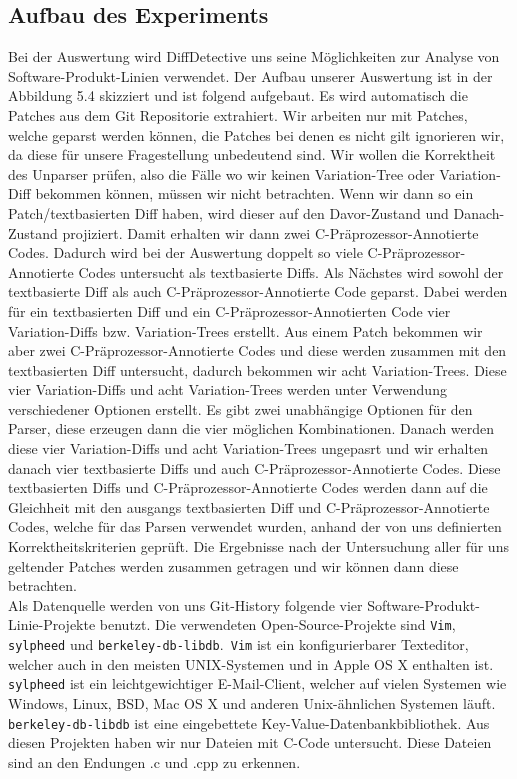\subsection{Aufbau des Experiments}
Bei der Auswertung wird DiffDetective uns seine Möglichkeiten zur Analyse von Software-Produkt-Linien verwendet. Der Aufbau unserer Auswertung ist in der Abbildung 5.4 skizziert und ist folgend aufgebaut. Es wird automatisch die Patches aus dem Git Repositorie extrahiert. Wir arbeiten nur mit Patches, welche geparst werden können, die Patches bei denen es nicht gilt ignorieren wir, da diese für unsere Fragestellung unbedeutend sind. Wir wollen die Korrektheit des Unparser prüfen, also die Fälle wo wir keinen Variation-Tree oder Variation-Diff bekommen können, müssen wir nicht betrachten. Wenn wir dann so ein Patch/textbasierten Diff haben, wird dieser auf den Davor-Zustand und Danach-Zustand projiziert. Damit erhalten wir dann zwei C-Präprozessor-Annotierte Codes. Dadurch wird bei der Auswertung doppelt so viele C-Präprozessor-Annotierte Codes untersucht als textbasierte Diffs. Als Nächstes wird sowohl der textbasierte Diff als auch C-Präprozessor-Annotierte Code geparst. Dabei werden für ein textbasierten Diff und ein C-Präprozessor-Annotierten Code vier Variation-Diffs bzw. Variation-Trees erstellt. Aus einem Patch bekommen wir aber zwei C-Präprozessor-Annotierte Codes und diese werden zusammen mit den textbasierten Diff untersucht, dadurch bekommen wir acht Variation-Trees. Diese vier Variation-Diffs und acht Variation-Trees werden unter Verwendung verschiedener Optionen erstellt. Es gibt zwei unabhängige Optionen für den Parser, diese erzeugen dann die vier möglichen Kombinationen. Danach werden diese vier Variation-Diffs und acht Variation-Trees ungepasrt und wir erhalten danach vier textbasierte Diffs und auch C-Präprozessor-Annotierte Codes. Diese textbasierten Diffs und C-Präprozessor-Annotierte Codes werden dann auf die Gleichheit mit den ausgangs textbasierten Diff und C-Präprozessor-Annotierte Codes, welche für das Parsen verwendet wurden, anhand der von uns definierten Korrektheitskriterien geprüft. Die Ergebnisse nach der Untersuchung aller für uns geltender Patches werden zusammen getragen und wir können dann diese betrachten.\\

Als Datenquelle werden von uns Git-History folgende vier Software-Produkt-Linie-Projekte benutzt. Die verwendeten Open-Source-Projekte sind \texttt{Vim}, \texttt{sylpheed} und \texttt{berkeley-db-libdb}.\texttt{ Vim} ist ein konfigurierbarer Texteditor, welcher auch in den meisten UNIX-Systemen und in Apple OS X enthalten ist. \texttt{sylpheed} ist ein leichtgewichtiger E-Mail-Client, welcher auf vielen Systemen wie Windows, Linux, BSD, Mac OS X und anderen Unix-ähnlichen Systemen läuft. \texttt{berkeley-db-libdb} ist eine eingebettete Key-Value-Datenbankbibliothek. Aus diesen Projekten haben wir nur Dateien mit C-Code untersucht. Diese Dateien sind an den Endungen .c und .cpp zu erkennen. 

